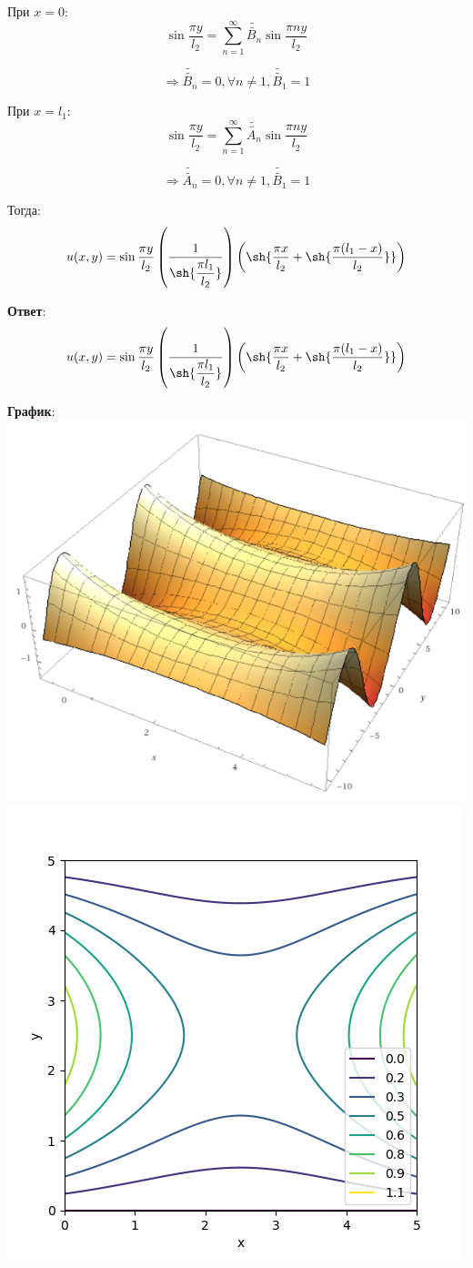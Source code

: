 При $x = 0$:
$$ \sin{\dfrac{\pi y}{l_{2}}} = \sum_{n=1}^{\infty} \tilde{\tilde{B_{n}}} \sin{\dfrac{\pi ny}{l_{2}}}$$

$$\Rightarrow \tilde{\tilde{B_{n}}} = 0, \forall n \neq 1, \tilde{\tilde{B_{1}}} = 1$$

При $x = l_{1}$:
$$ \sin{\dfrac{\pi y}{l_{2}}} = \sum_{n=1}^{\infty} \tilde{\tilde{A_{n}}} \sin{\dfrac{\pi ny}{l_{2}}}$$

$$\Rightarrow \tilde{\tilde{A_{n}}} = 0, \forall n \neq 1, \tilde{\tilde{B_{1}}} = 1 $$

Тогда:
$$ u(x, y) = \sin{\dfrac{\pi y}{l_{2}}} \left( \dfrac{1}{\sh{\dfrac{\pi l_{1}}{l_{2}}}} \right) \left( \sh{\dfrac{\pi x}{l_{2}} + \sh{\dfrac{\pi (l_{1} - x)}{l_{2}}}} \right)$$

\textbf{Ответ}:
$$ u(x, y) = \sin{\dfrac{\pi y}{l_{2}}} \left( \dfrac{1}{\sh{\dfrac{\pi l_{1}}{l_{2}}}} \right) \left( \sh{\dfrac{\pi x}{l_{2}} + \sh{\dfrac{\pi (l_{1} - x)}{l_{2}}}} \right)$$


\textbf{График}:\\
\includegraphics[width=0.7\linewidth]{3_1.png}\\
\includegraphics[width=0.7\linewidth]{3_2.png}

\pagebreak